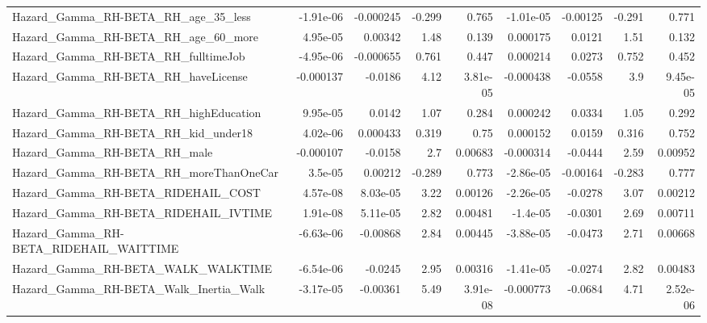 \begin{tabular}{lrrrrrrrr}
Hazard\_Gamma\_RH-BETA\_RH\_age\_35\_less                &   -1.91e-06 &    -0.000245 &   -0.299 &    0.765 &  -1.01e-05 &    -0.00125 &       -0.291 &         0.771 \\
Hazard\_Gamma\_RH-BETA\_RH\_age\_60\_more                &    4.95e-05 &      0.00342 &     1.48 &    0.139 &   0.000175 &      0.0121 &         1.51 &         0.132 \\
Hazard\_Gamma\_RH-BETA\_RH\_fulltimeJob                &   -4.95e-06 &    -0.000655 &    0.761 &    0.447 &   0.000214 &      0.0273 &        0.752 &         0.452 \\
Hazard\_Gamma\_RH-BETA\_RH\_haveLicense                &   -0.000137 &      -0.0186 &     4.12 & 3.81e-05 &  -0.000438 &     -0.0558 &          3.9 &      9.45e-05 \\
Hazard\_Gamma\_RH-BETA\_RH\_highEducation              &    9.95e-05 &       0.0142 &     1.07 &    0.284 &   0.000242 &      0.0334 &         1.05 &         0.292 \\
Hazard\_Gamma\_RH-BETA\_RH\_kid\_under18                &    4.02e-06 &     0.000433 &    0.319 &     0.75 &   0.000152 &      0.0159 &        0.316 &         0.752 \\
Hazard\_Gamma\_RH-BETA\_RH\_male                       &   -0.000107 &      -0.0158 &      2.7 &  0.00683 &  -0.000314 &     -0.0444 &         2.59 &       0.00952 \\
Hazard\_Gamma\_RH-BETA\_RH\_moreThanOneCar             &     3.5e-05 &      0.00212 &   -0.289 &    0.773 &  -2.86e-05 &    -0.00164 &       -0.283 &         0.777 \\
Hazard\_Gamma\_RH-BETA\_RIDEHAIL\_COST                 &    4.57e-08 &     8.03e-05 &     3.22 &  0.00126 &  -2.26e-05 &     -0.0278 &         3.07 &       0.00212 \\
Hazard\_Gamma\_RH-BETA\_RIDEHAIL\_IVTIME               &    1.91e-08 &     5.11e-05 &     2.82 &  0.00481 &   -1.4e-05 &     -0.0301 &         2.69 &       0.00711 \\
Hazard\_Gamma\_RH-BETA\_RIDEHAIL\_WAITTIME             &   -6.63e-06 &     -0.00868 &     2.84 &  0.00445 &  -3.88e-05 &     -0.0473 &         2.71 &       0.00668 \\
Hazard\_Gamma\_RH-BETA\_WALK\_WALKTIME                 &   -6.54e-06 &      -0.0245 &     2.95 &  0.00316 &  -1.41e-05 &     -0.0274 &         2.82 &       0.00483 \\
Hazard\_Gamma\_RH-BETA\_Walk\_Inertia\_Walk             &   -3.17e-05 &     -0.00361 &     5.49 & 3.91e-08 &  -0.000773 &     -0.0684 &         4.71 &      2.52e-06 \\

\end{tabular}
